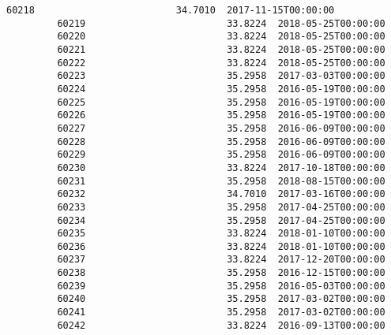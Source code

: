 \documentclass[11pt]{article}
\begin{document}
\begin{Verbatim}[commandchars=\\\{\}]
         60218                         34.7010  2017-11-15T00:00:00   
         60219                         33.8224  2018-05-25T00:00:00   
         60220                         33.8224  2018-05-25T00:00:00   
         60221                         33.8224  2018-05-25T00:00:00   
         60222                         33.8224  2018-05-25T00:00:00   
         60223                         35.2958  2017-03-03T00:00:00   
         60224                         35.2958  2016-05-19T00:00:00   
         60225                         35.2958  2016-05-19T00:00:00   
         60226                         35.2958  2016-05-19T00:00:00   
         60227                         35.2958  2016-06-09T00:00:00   
         60228                         35.2958  2016-06-09T00:00:00   
         60229                         35.2958  2016-06-09T00:00:00   
         60230                         33.8224  2017-10-18T00:00:00   
         60231                         35.2958  2018-08-15T00:00:00   
         60232                         34.7010  2017-03-16T00:00:00   
         60233                         35.2958  2017-04-25T00:00:00   
         60234                         35.2958  2017-04-25T00:00:00   
         60235                         33.8224  2018-01-10T00:00:00   
         60236                         33.8224  2018-01-10T00:00:00   
         60237                         33.8224  2017-12-20T00:00:00   
         60238                         35.2958  2016-12-15T00:00:00   
         60239                         35.2958  2016-05-03T00:00:00   
         60240                         35.2958  2017-03-02T00:00:00   
         60241                         35.2958  2017-03-02T00:00:00   
         60242                         33.8224  2016-09-13T00:00:00   
         

\end{Verbatim}
\end{document}
